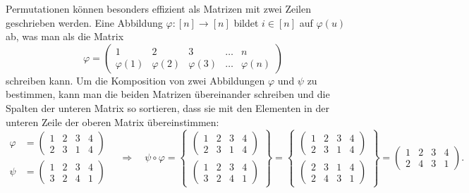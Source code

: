 Permutationen können besonders effizient als Matrizen mit zwei Zeilen
geschrieben werden.
Eine Abbildung $\varphi\colon [n]\to[n]$ bildet $i\in [n]$ auf $\varphi(u)$
ab, was man als die Matrix
\[
\varphi
=
\begin{pmatrix}
1&2&3&\dots&n\\
\varphi(1)&\varphi(2)&\varphi(3)&\dots&\varphi(n)
\end{pmatrix}
\]
schreiben kann.
Um die Komposition von zwei Abbildungen $\varphi$ und $\psi$ zu bestimmen,
kann man die beiden Matrizen übereinander schreiben und die Spalten der
unteren Matrix so sortieren, dass sie mit den Elementen in der unteren
Zeile der oberen Matrix übereinstimmen:
\[
\begin{aligned}
\varphi
&=
\begin{pmatrix}1&2&3&4\\2&3&1&4\end{pmatrix}
\\
\psi
&=
\begin{pmatrix}1&2&3&4\\3&2&4&1\end{pmatrix}
\end{aligned}
\quad\Rightarrow\quad
\psi\circ \varphi
=
\left\{
\begin{array}{c}
\displaystyle\begin{pmatrix}1&2&3&4\\2&3&1&4\end{pmatrix}\\
\displaystyle\begin{pmatrix}1&2&3&4\\3&2&4&1\end{pmatrix}
\end{array}
\right\}
=
\left\{
\begin{array}{c}
\displaystyle\begin{pmatrix}1&2&3&4\\2&3&1&4\end{pmatrix}\\
\displaystyle\begin{pmatrix}2&3&1&4\\2&4&3&1\end{pmatrix}
\end{array}
\right\}
=
\begin{pmatrix}
1&2&3&4\\
2&4&3&1
\end{pmatrix}.
\]

